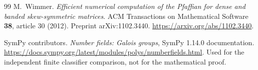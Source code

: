 \documentclass[11pt,letterpaper]{article}
\numberwithin{equation}{section}
\theoremstyle{definition}
\theoremstyle{remark}
\begin{document}
\begin{thebibliography}{99}
M.~Wimmer.
\emph{Efficient numerical computation of the Pfaffian for dense and
banded skew-symmetric matrices}.
ACM Transactions on Mathematical Software \textbf{38}, article 30 (2012).
Preprint arXiv:1102.3440.
\url{https://arxiv.org/abs/1102.3440}.

SymPy contributors.
\emph{Number fields: Galois groups}, SymPy 1.14.0 documentation.
\url{https://docs.sympy.org/latest/modules/polys/numberfields.html}.
Used for the independent finite classifier comparison, not for the
mathematical proof.

\end{thebibliography}
\end{document}

